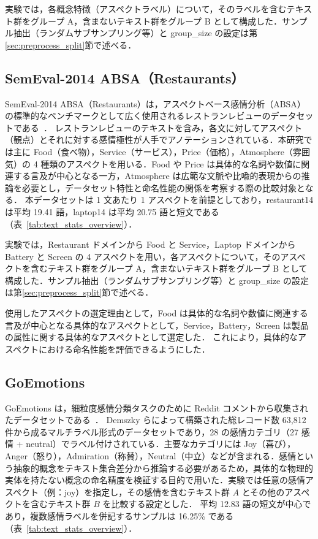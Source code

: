 実験では，各概念特徴（アスペクトラベル）について，そのラベルを含むテキスト群をグループ A，含まないテキスト群をグループ B として構成した．サンプル抽出（ランダムサブサンプリング等）と group\_size の設定は第\ref{sec:preprocess_split}節で述べる．


\subsection{SemEval-2014 ABSA（Restaurants）}
SemEval-2014 ABSA（Restaurants）は，アスペクトベース感情分析（ABSA）の標準的なベンチマークとして広く使用されるレストランレビューのデータセットである~\cite{pontiki-EtAl:2014:SemEval2014Task4}．
レストランレビューのテキストを含み，各文に対してアスペクト（観点）とそれに対する感情極性が人手でアノテーションされている．本研究では主に Food（食べ物），Service（サービス），Price（価格），Atmosphere（雰囲気）の 4 種類のアスペクトを用いる．Food や Price は具体的な名詞や数値に関連する言及が中心となる一方，Atmosphere は広範な文脈や比喩的表現からの推論を必要とし，データセット特性と命名性能の関係を考察する際の比較対象となる．
本データセットは 1 文あたり 1 アスペクトを前提としており，restaurant14 は平均 19.41 語，laptop14 は平均 20.75 語と短文である（表~\ref{tab:text_stats_overview}）．

実験では，Restaurant ドメインから Food と Service，Laptop ドメインから Battery と Screen の 4 アスペクトを用い，各アスペクトについて，そのアスペクトを含むテキスト群をグループ A，含まないテキスト群をグループ B として構成した．サンプル抽出（ランダムサブサンプリング等）と group\_size の設定は第\ref{sec:preprocess_split}節で述べる．

使用したアスペクトの選定理由として，Food は具体的な名詞や数値に関連する言及が中心となる具体的なアスペクトとして，Service，Battery，Screen は製品の属性に関する具体的なアスペクトとして選定した．
これにより，具体的なアスペクトにおける命名性能を評価できるようにした．

\subsection{GoEmotions}
GoEmotions は，細粒度感情分類タスクのために Reddit コメントから収集されたデータセットである~\cite{demszky2020goemotions}．
Demszky らによって構築された総レコード数 63,812 件から成るマルチラベル形式のデータセットであり，28 の感情カテゴリ（27 感情 + neutral）でラベル付けされている．主要なカテゴリには Joy（喜び），Anger（怒り），Admiration（称賛），Neutral（中立）などが含まれる．感情という抽象的概念をテキスト集合差分から推論する必要があるため，具体的な物理的実体を持たない概念の命名精度を検証する目的で用いた．実験では任意の感情アスペクト（例：joy）を指定し，その感情を含むテキスト群 $A$ とその他のアスペクトを含むテキスト群 $B$ を比較する設定とした．
平均 12.83 語の短文が中心であり，複数感情ラベルを併記するサンプルは 16.25\% である（表~\ref{tab:text_stats_overview}）．

